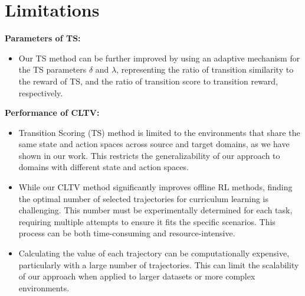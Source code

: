 \section{Limitations}
\label{sec-limitations}

\textbf{Parameters of TS:}
\begin{itemize}
    \item Our TS method can be further improved by using an adaptive mechanism for the TS parameters $\delta$ and $\lambda$, representing the ratio of transition similarity to the reward of TS, and the ratio of transition score to transition reward, respectively.
\end{itemize}
\textbf{Performance of CLTV:}
\begin{itemize}
    \item Transition Scoring (TS) method is limited to the environments that share the same state and action spaces across source and target domains, as we have shown in our work. This restricts the generalizability of our approach to domains with different state and action spaces.
    \item While our CLTV method significantly improves offline RL methods, finding the optimal number of selected trajectories for curriculum learning is challenging. This number must be experimentally determined for each task, requiring multiple attempts to ensure it fits the specific scenarios. This process can be both time-consuming and resource-intensive.
    \item Calculating the value of each trajectory can be computationally expensive, particularly with a large number of trajectories. This can limit the scalability of our approach when applied to larger datasets or more complex environments.
\end{itemize}